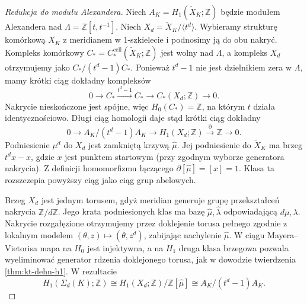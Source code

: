 \begin{proof}[Redukcja do modułu Alexandera]
Niech $A_K=H_1(\widetilde X_K;\mathbb Z)$ będzie modułem
Alexandera nad $\Lambda=\mathbb Z[t,t^{-1}]$.
Niech $X_d=\widetilde X_K/\langle t^d\rangle$.
Wybieramy strukturę komórkową $X_K$ z meridianem
w 1-szkielecie i podnosimy ją do obu nakryć.
Kompleks komórkowy
$C_*=C_*^{\mathrm{cell}}(\widetilde X_K;\mathbb Z)$ jest
wolny nad $\Lambda$, a kompleks $X_d$ otrzymujemy
jako $C_* /(t^d-1)C_*$. Ponieważ $t^d-1$ nie jest
dzielnikiem zera w $\Lambda$, mamy krótki ciąg
dokładny kompleksów
\[
0\longrightarrow C_*\xrightarrow{t^d-1}C_*
\longrightarrow C_*(X_d;\mathbb Z)\longrightarrow0.
\]
Nakrycie nieskończone jest spójne, więc $H_0(C_*)=\mathbb Z$,
na którym $t$ działa identycznościowo. Długi ciąg
homologii daje stąd krótki ciąg dokładny
\[
0\longrightarrow A_K/(t^d-1)A_K
\longrightarrow H_1(X_d;\mathbb Z)
\xrightarrow{\partial}\mathbb Z\longrightarrow0.
\]
Podniesienie $\mu^d$ do $X_d$ jest zamkniętą krzywą
$\widehat\mu$. Jej podniesienie do $\widetilde X_K$
ma brzeg $t^d x-x$, gdzie $x$ jest punktem startowym
(przy zgodnym wyborze generatora nakrycia).
Z definicji homomorfizmu łączącego
$\partial[\widehat\mu]=[x]=1$. Klasa ta rozszczepia
powyższy ciąg jako ciąg grup abelowych.

Brzeg $X_d$ jest jednym torusem, gdyż meridian
generuje grupę przekształceń nakrycia $\mathbb Z/d\mathbb Z$.
Jego krata podniesionych klas ma bazę
$\widehat\mu,\widehat\lambda$ odpowiadającą
$d\mu,\lambda$. Nakrycie rozgałęzione otrzymujemy
przez doklejenie torusa pełnego zgodnie z lokalnym
modelem $(\theta,z)\mapsto(\theta,z^d)$, zabijając
nachylenie $\widehat\mu$. W ciągu Mayera--Vietorisa
mapa na $H_0$ jest injektywna, a na $H_1$ druga
klasa brzegowa pozwala wyeliminować generator
rdzenia doklejonego torusa, jak w dowodzie
twierdzenia \ref{thm:kt-dehn-h1}.
W rezultacie
\[
H_1(\Sigma_d(K);\mathbb Z)
\cong H_1(X_d;\mathbb Z)/\mathbb Z[\widehat\mu]
\cong A_K/(t^d-1)A_K.
\]


\end{proof}
